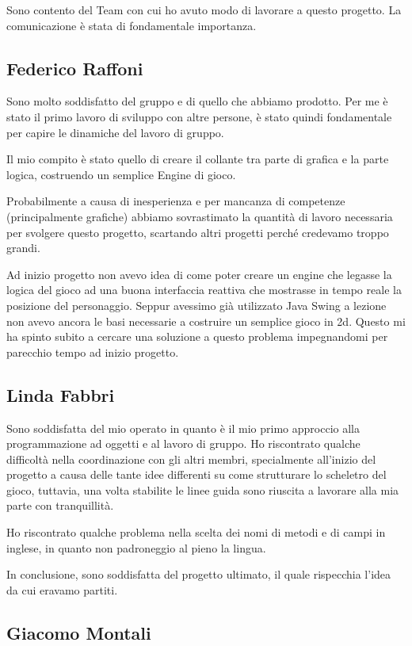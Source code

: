 \documentclass[a4paper,12pt]{report}
\begin{document}
Sono contento del Team con cui ho avuto modo di lavorare a questo progetto. La comunicazione è stata di fondamentale importanza.

\subsection{Federico Raffoni}
Sono molto soddisfatto del gruppo e di quello che abbiamo prodotto. Per me è stato il primo lavoro di sviluppo con altre persone, è stato quindi fondamentale per capire le dinamiche del lavoro di gruppo. 

Il mio compito è stato quello di creare il collante tra parte di grafica e la parte logica, costruendo un semplice Engine di gioco.

Probabilmente a causa di inesperienza e per mancanza di competenze (principalmente grafiche) abbiamo sovrastimato la quantità di lavoro necessaria per svolgere questo progetto, scartando altri progetti perché credevamo troppo grandi.

Ad inizio progetto non avevo idea di come poter creare un engine che legasse la logica del gioco ad una buona interfaccia reattiva che mostrasse in tempo reale la posizione del personaggio. Seppur avessimo già utilizzato Java Swing a lezione non avevo ancora le basi necessarie a costruire un semplice gioco in 2d. Questo mi ha spinto subito a cercare una soluzione a questo problema impegnandomi per parecchio tempo ad inizio progetto.
\subsection{Linda Fabbri}
Sono soddisfatta del mio operato in quanto è il mio primo approccio alla programmazione ad oggetti e al lavoro di gruppo. Ho riscontrato qualche difficoltà nella coordinazione con gli altri membri, specialmente all’inizio del progetto a causa delle tante idee differenti su come strutturare lo scheletro del gioco, tuttavia, una volta stabilite le linee guida sono riuscita a lavorare alla mia parte con tranquillità. 

Ho riscontrato qualche problema nella scelta dei nomi di metodi e di campi in inglese, in quanto non padroneggio al pieno la lingua.

In conclusione, sono soddisfatta del progetto ultimato, il quale rispecchia l’idea da cui eravamo partiti.

\subsection{Giacomo Montali}
\end{document}
